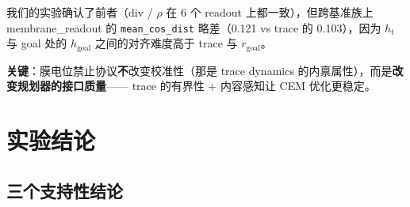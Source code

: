 \documentclass[11pt,a4paper]{article}
\begin{document}
我们的实验确认了前者（div / \ensuremath{\rho} 在 6 个 readout 上都一致），但跨基准族上 membrane\_readout 的 \texttt{mean\_cos\_dist} 略差（0.121 vs trace 的 0.103），因为 $h_t$ 与 goal 处的 $h_\text{goal}$ 之间的对齐难度高于 trace 与 $r_\text{goal}$。

\textbf{关键}：膜电位禁止协议\textbf{不}改变校准性（那是 trace dynamics 的内禀属性），而是\textbf{改变规划器的接口质量}—— trace 的有界性 + 内容感知让 CEM 优化更稳定。

\section{实验结论}

\subsection{三个支持性结论}
\end{document}
